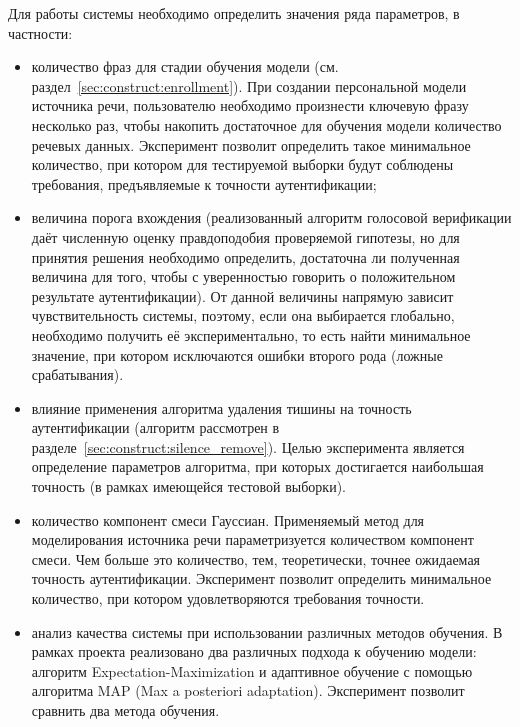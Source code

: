 Для работы системы необходимо определить значения ряда параметров, в частности:

\begin{itemize}

\item количество фраз для стадии обучения модели (см.
раздел~\ref{sec:construct:enrollment}). При создании персональной модели
источника речи, пользователю необходимо произнести ключевую фразу несколько раз,
чтобы накопить достаточное для обучения модели количество речевых данных.
Эксперимент позволит определить такое минимальное количество, при котором для
тестируемой выборки будут соблюдены требования, предъявляемые к точности
аутентификации;

\item величина порога вхождения (реализованный алгоритм голосовой верификации даёт
численную оценку правдоподобия проверяемой гипотезы, но для принятия решения
необходимо определить, достаточна ли полученная величина для того, чтобы с
уверенностью говорить о положительном результате аутентификации). От данной
величины напрямую зависит чувствительность системы, поэтому, если она выбирается
глобально, необходимо получить её экспериментально, то есть найти минимальное
значение, при котором исключаются ошибки второго рода (ложные срабатывания).

\item влияние применения алгоритма удаления тишины на точность аутентификации (алгоритм
рассмотрен в разделе~\ref{sec:construct:silence_remove}). Целью эксперимента
является определение параметров алгоритма, при которых достигается наибольшая
точность (в рамках имеющейся тестовой выборки).

\item количество компонент смеси Гауссиан. Применяемый метод для моделирования
источника речи параметризуется количеством компонент смеси. Чем больше это
количество, тем, теоретически, точнее ожидаемая точность аутентификации.
Эксперимент позволит определить минимальное количество, при котором
удовлетворяются требования точности.

\item анализ качества системы при использовании различных методов обучения. В
рамках проекта реализовано два различных подхода к обучению модели: алгоритм
Expectation-Maximization и адаптивное обучение с помощью алгоритма MAP (Max a
posteriori adaptation). Эксперимент позволит сравнить два метода обучения.

\end{itemize}

